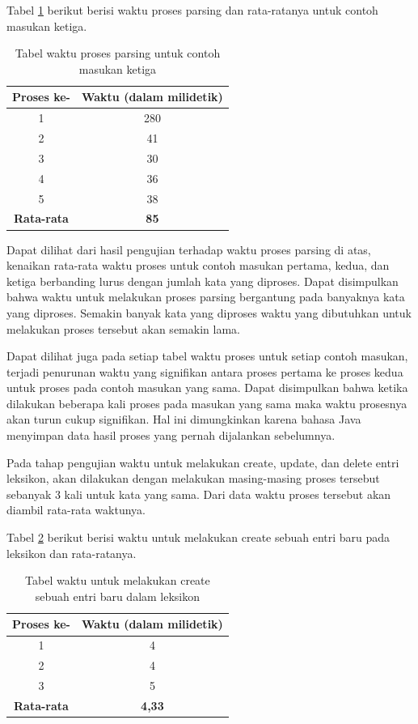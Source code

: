 Tabel \ref{tabel-waktu-parsing-ketiga} berikut berisi waktu proses parsing dan rata-ratanya untuk contoh masukan ketiga.

\begin{table}[H]
\centering
\begin{tabular}{|c|c|}
\hline
\textbf{Proses ke-} & \textbf{Waktu} (dalam milidetik) \\
\hline
1&280\\
2&41\\
3&30\\
4&36\\
5&38\\
\hline
\textbf{Rata-rata} & \textbf{85}\\
\hline
\end{tabular}
\caption{Tabel waktu proses parsing untuk contoh masukan ketiga} 
\label{tabel-waktu-parsing-ketiga}
\end{table}

Dapat dilihat dari hasil pengujian terhadap waktu proses parsing di atas, kenaikan rata-rata waktu proses untuk contoh masukan pertama, kedua, dan ketiga berbanding lurus dengan jumlah kata yang diproses. Dapat disimpulkan bahwa waktu untuk melakukan proses parsing bergantung pada banyaknya kata yang diproses. Semakin banyak kata yang diproses waktu yang dibutuhkan untuk melakukan proses tersebut akan semakin lama.

Dapat dilihat juga pada setiap tabel waktu proses untuk setiap contoh masukan, terjadi penurunan waktu yang signifikan antara proses pertama ke proses kedua untuk proses pada contoh masukan yang sama. Dapat disimpulkan bahwa ketika dilakukan beberapa kali proses pada masukan yang sama maka waktu prosesnya akan turun cukup signifikan. Hal ini dimungkinkan karena bahasa Java menyimpan data hasil proses yang pernah dijalankan sebelumnya.

Pada tahap pengujian waktu untuk melakukan create, update, dan delete entri leksikon, akan dilakukan dengan melakukan masing-masing proses tersebut sebanyak 3 kali untuk kata yang sama. Dari data waktu proses tersebut akan diambil rata-rata waktunya.

Tabel \ref{tabel-waktu-create} berikut berisi waktu untuk melakukan create sebuah entri baru pada leksikon dan rata-ratanya.

\begin{table}[H]
\centering
\begin{tabular}{|c|c|}
\hline
\textbf{Proses ke-} & \textbf{Waktu} (dalam milidetik) \\
\hline
1&4\\
2&4\\
3&5\\
\hline
\textbf{Rata-rata} & \textbf{4,33}\\
\hline
\end{tabular}
\caption{Tabel waktu untuk melakukan create sebuah entri baru dalam leksikon} 
\label{tabel-waktu-create}
\end{table}

